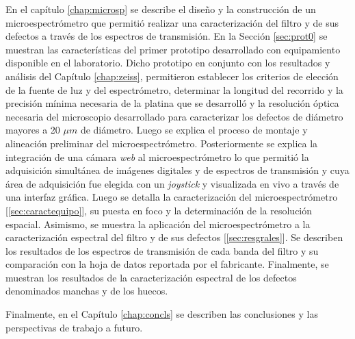 En el capítulo \ref{chap:microsp} se describe el diseño y la construcción de un microespectrómetro que permitió realizar una caracterización del filtro y de sus defectos a través de los espectros de transmisión. En la Sección \ref{sec:prot0} se muestran las características del primer prototipo desarrollado con equipamiento disponible en el laboratorio. Dicho prototipo en conjunto con los resultados y análisis del Capítulo \ref{chap:zeiss}, permitieron establecer los criterios de elección de la fuente de luz y del espectrómetro, determinar la longitud del recorrido y la precisión mínima necesaria de la platina que se desarrolló y la resolución óptica necesaria del microscopio desarrollado para caracterizar los defectos de diámetro mayores a 20 $\mu m$ de diámetro. Luego se explica el proceso de montaje y alineación preliminar del microespectrómetro. Posteriormente se explica la integración de una cámara \textit{web} al microespectrómetro lo que permitió la adquisición simultánea de imágenes digitales y de espectros de transmisión y cuya área de adquisición fue elegida con un \textit{joystick} y visualizada en vivo a través de una interfaz gráfica. Luego se detalla la caracterización del microespectrómetro [\ref{sec:caractequipo}], su puesta en foco y la determinación de la resolución espacial. Asimismo, se muestra la aplicación del microespectrómetro a la caracterización espectral del filtro y de sus defectos [\ref{sec:resgrales}]. Se describen los resultados de los espectros de transmisión de cada banda del filtro y su comparación con la hoja de datos reportada por el fabricante. Finalmente, se muestran los resultados de la caracterización espectral de los defectos denominados manchas y de los huecos.

Finalmente, en el Capítulo \ref{chap:concls} se describen las conclusiones y las perspectivas de trabajo a futuro.



